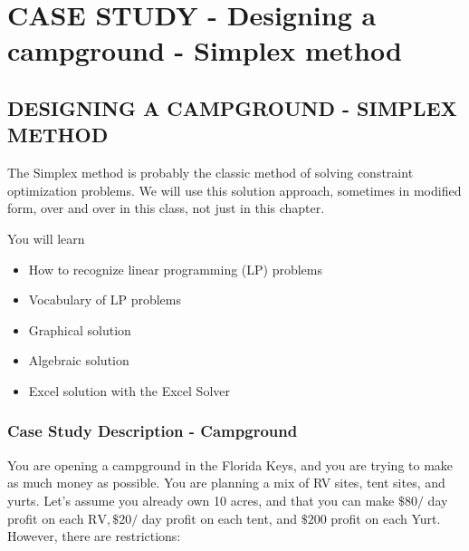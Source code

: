 \chapter{CASE STUDY - Designing a campground - Simplex method}
\section{DESIGNING A CAMPGROUND - SIMPLEX METHOD}
The Simplex method is probably the classic method of solving constraint optimization problems. We will use this solution approach, sometimes in modified form, over and over in this class, not just in this chapter.

\begin{outcome}
You will learn

\begin{itemize}
  \item How to recognize linear programming (LP) problems

  \item Vocabulary of LP problems

  \item Graphical solution

  \item Algebraic solution

  \item Excel solution with the Excel Solver

\end{itemize}
\end{outcome}
\subsection{Case Study Description - Campground}
You are opening a campground in the Florida Keys, and you are trying to make as much money as possible. You are planning a mix of RV sites, tent sites, and yurts. Let's assume you already own 10 acres, and that you can make $\$ 80 /$ day profit on each $\mathrm{RV}, \$ 20 /$ day profit on each tent, and $\$ 200$ profit on each Yurt. However, there are restrictions:

